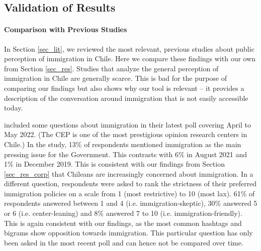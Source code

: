 \subsection{Validation of Results}\label{sec_disc_prev}
    
    \paragraph{Comparison with Previous Studies}
    In Section \ref{sec_lit}, we reviewed the most relevant, previous studies about public perception of immigration in Chile. Here we compare these findings with our own from Section \ref{sec_res}. Studies that analyze the general perception of immigration in Chile are generally scarce. This is bad for the purpose of comparing our findings but also shows why our tool is relevant -- it provides a description of the conversation around immigration that is not easily accessible today. 
    
    \cite{CEP_86} included some questions about immigration in their latest poll covering April to May 2022. (The CEP is one of the most prestigious opinion research centers in Chile.) In the study, 13\% of respondents mentioned immigration as the main pressing issue for the Government. This contrasts with 6\% in August 2021 and 1\% in December 2019. This is consistent with our findings from Section \ref{sec_res_corp} that Chileans are increasingly concerned about immigration. In a different question, respondents were asked to rank the strictness of their preferred immigration policies on a scale from 1 (most restrictive) to 10 (most lax). 61\% of respondents answered between 1 and 4 (i.e. immigration-skeptic), 30\% answered 5 or 6 (i.e. center-leaning) and 8\% answered 7 to 10 (i.e. immigration-friendly). This is again consistent with our findings, as the most common hashtags and bigrams show opposition towards immigration. This particular question has only been asked in the most recent poll and can hence not be compared over time.
    
